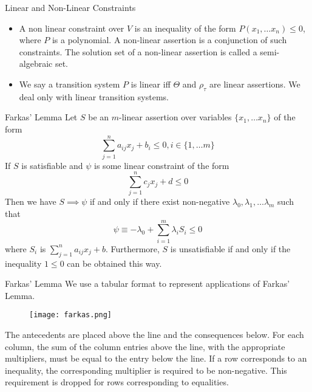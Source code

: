 \documentclass{beamer}
\begin{document}
{\begin{frame}{Linear and Non-Linear Constraints}
\begin{itemize}
                \item A non linear constraint over $V$ is an inequality of the form $P(x_{1}, \dots x_{n}) \leq 0$, where $P$ is a polynomial. A non-linear assertion is a conjunction of such constraints. The solution set of a non-linear assertion is called a semi-algebraic set.
                \item We say a transition system $P$ is linear iff $\Theta$ and $\rho_{\tau}$ are linear assertions. We deal only with linear transition systems.
            \end{itemize}
        \end{frame}
        \begin{frame}{Farkas' Lemma}
            Let $S$ be an $m$-linear assertion over variables $\{x_{1}, \dots x_{n}\}$ of the form
            \begin{equation*}
                \sum\limits_{j = 1}^{n} a_{ij}x_{j} + b_{i} \leq 0, i \in \{1, \dots m\}
            \end{equation*}
            If $S$ is satisfiable and $\psi$ is some linear constraint of the form
            \begin{equation*}
                \sum\limits_{j = 1}^{n}c_{j}x_{j} + d \leq 0
            \end{equation*}
            Then we have $S \implies \psi$ if and only if there exist non-negative $\lambda_{0}, \lambda_{1}, \dots \lambda_{m}$ such that
            \begin{equation*}
                \psi \equiv -\lambda_{0} + \sum\limits_{i = 1}^{m} \lambda_{i} S_{i} \leq 0
            \end{equation*}
            where $S_{i}$ is $\sum\limits_{j = 1}^{n} a_{ij}x _{j} + b$. Furthermore, $S$ is unsatisfiable if and only if the inequality $1 \leq 0$ can be obtained this way.
        \end{frame}
        \begin{frame}{Farkas' Lemma}
            We use a tabular format to represent applications of Farkas' Lemma.
            \begin{figure}[h!]
                \texttt{[image: farkas.png]}
            \end{figure}
            The antecedents are placed above the line and the consequences below. For each column, the sum of the column entries above the line, with the appropriate multipliers, must be equal to the entry below the line. If a row corresponds to an inequality, the corresponding multiplier is required to be non-negative. This requirement is dropped for rows corresponding to equalities.
        \end{frame}
    }
\end{document}

